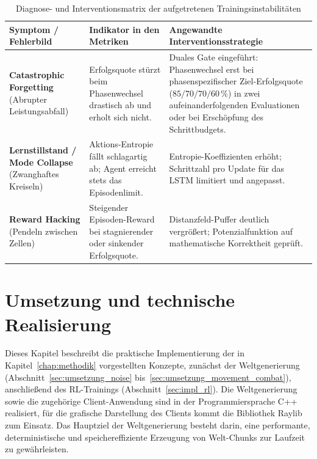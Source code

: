 \documentclass[
  a4paper,
  11pt,
  twoside,
  BCOR=8mm,           %
  headings=big,
  numbers=noenddot,
  listof=totoc,       %
  captions=tableheading,
]{scrreprt}
\begin{document}
\begin{table}[htbp]
    \centering
    \caption{Diagnose- und Interventionsmatrix der aufgetretenen Trainingsinstabilitäten}
    \label{tab:troubleshooting}
    \begin{tabular}{p{4.2cm} p{5cm} p{5.3cm}}
        \toprule
        \textbf{Symptom / Fehlerbild} & \textbf{Indikator in den Metriken} & \textbf{Angewandte Interventionsstrategie} \\
        \midrule
        \textbf{Catastrophic Forgetting} \newline (Abrupter Leistungsabfall) & Erfolgsquote stürzt beim Phasenwechsel drastisch ab und erholt sich nicht. & Duales Gate eingeführt: Phasenwechsel erst bei phasenspezifischer Ziel-Erfolgsquote ($85/70/70/60\,\%$) in zwei aufeinanderfolgenden Evaluationen oder bei Erschöpfung des Schrittbudgets. \\[2ex]

        \textbf{Lernstillstand / \newline Mode Collapse} \newline (Zwanghaftes Kreiseln) & Aktions-Entropie fällt schlagartig ab; Agent erreicht stets das Episodenlimit. & Entropie-Koeffizienten erhöht; Schrittzahl pro Update für das LSTM limitiert und angepasst. \\[2ex]

        \textbf{Reward Hacking} \newline (Pendeln zwischen Zellen) & Steigender Episoden-Reward bei stagnierender oder sinkender Erfolgsquote. & Distanzfeld-Puffer deutlich vergrößert; Potenzialfunktion auf mathematische Korrektheit geprüft. \\
        \bottomrule
    \end{tabular}
\end{table}

\chapter{Umsetzung und technische Realisierung}
\label{chap:umsetzung}

Dieses Kapitel beschreibt die praktische Implementierung der in Kapitel~\ref{chap:methodik} vorgestellten Konzepte, zunächst der Weltgenerierung (Abschnitt~\ref{sec:umsetzung_noise} bis~\ref{sec:umsetzung_movement_combat}), anschließend des RL-Trainings (Abschnitt~\ref{sec:impl_rl}). Die Weltgenerierung sowie die zugehörige Client-Anwendung sind in der Programmiersprache C++ realisiert, für die grafische Darstellung des Clients kommt die Bibliothek Raylib zum Einsatz. Das Hauptziel der Weltgenerierung besteht darin, eine performante, deterministische und speichereffiziente Erzeugung von Welt-Chunks zur Laufzeit zu gewährleisten.
\end{document}
